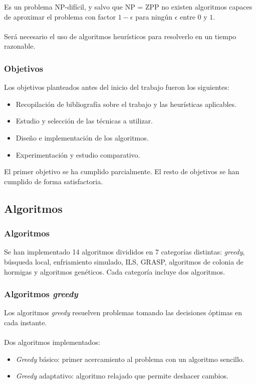 \documentclass{beamer}
\theoremstyle{theorem}
\begin{document}
\begin{frame}

  Es un problema NP-difícil, y salvo que NP = ZPP no existen algoritmos capaces de aproximar el
  problema con factor $1-\epsilon$ para ningún $\epsilon$ entre $0$ y $1$. \\~\\

  Será necesario el uso de algoritmos heurísticos para resolverlo en un tiempo razonable.
\end{frame}


\begin{frame}
  \frametitle{Objetivos}
  Los objetivos planteados antes del inicio del trabajo fueron los siguientes:
  \begin{itemize}
    \item Recopilación de bibliografía sobre el trabajo y las heurísticas aplicables.
    \item Estudio y selección de las técnicas a utilizar.
    \item Diseño e implementación de los algoritmos.
    \item Experimentación y estudio comparativo.
  \end{itemize}
  El primer objetivo se ha cumplido parcialmente. El resto de objetivos se han cumplido de forma satisfactoria.

\end{frame}


\subsection{Algoritmos}

\begin{frame}
  \frametitle{Algoritmos}
  Se han implementado 14 algoritmos divididos en 7 categorías distintas: \textit{greedy}, búsqueda local,
  enfriamiento simulado, ILS, GRASP, algoritmos de colonia de hormigas y algoritmos genéticos.
  Cada categoría incluye dos algoritmos.

\end{frame}

\begin{frame}
  \frametitle{Algoritmos \textit{greedy}}
  Los algoritmos \textit{greedy} resuelven problemas tomando las decisiones óptimas en cada instante. \\~\\

  Dos algoritmos implementados:
  \begin{itemize}
    \item \textit{Greedy} básico: primer acercamiento al problema con un algoritmo sencillo.
    \item \textit{Greedy} adaptativo: algoritmo relajado que permite deshacer cambios. \cite{grosso:2004}
  \end{itemize}

\end{frame}
\end{document}
